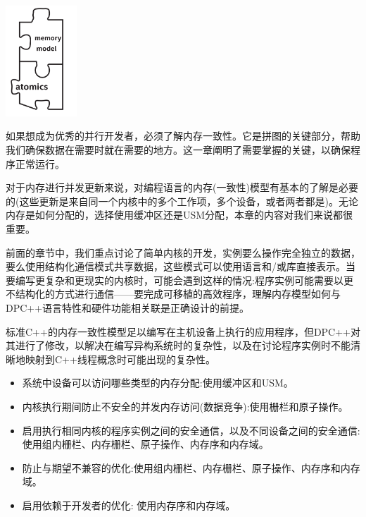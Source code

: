 \begin{center}
	\includegraphics[width=0.2\textwidth]{content/chapter-19/images/1}
\end{center}

如果想成为优秀的并行开发者，必须了解内存一致性。它是拼图的关键部分，帮助我们确保数据在需要时就在需要的地方。这一章阐明了需要掌握的关键，以确保程序正常运行。\par

对于内存进行并发更新来说，对编程语言的内存(一致性)模型有基本的了解是必要的(这些更新是来自同一个内核中的多个工作项，多个设备，或者两者都是)。无论内存是如何分配的，选择使用缓冲区还是USM分配，本章的内容对我们来说都很重要。\par

前面的章节中，我们重点讨论了简单内核的开发，实例要么操作完全独立的数据，要么使用结构化通信模式共享数据，这些模式可以使用语言和/或库直接表示。当要编写更复杂和更现实的内核时，可能会遇到这样的情况:程序实例可能需要以更不结构化的方式进行通信——要完成可移植的高效程序，理解内存模型如何与DPC++语言特性和硬件功能相关联是正确设计的前提。\par

标准C++的内存一致性模型足以编写在主机设备上执行的应用程序，但DPC++对其进行了修改，以解决在编写异构系统时的复杂性，以及在讨论程序实例时不能清晰地映射到C++线程概念时可能出现的复杂性。\par

\begin{itemize}
	\item 系统中设备可以访问哪些类型的内存分配:使用缓冲区和USM。
	\item 内核执行期间防止不安全的并发内存访问(数据竞争):使用栅栏和原子操作。
	\item 启用执行相同内核的程序实例之间的安全通信，以及不同设备之间的安全通信:使用组内栅栏、内存栅栏、原子操作、内存序和内存域。
	\item 防止与期望不兼容的优化:使用组内栅栏、内存栅栏、原子操作、内存序和内存域。
	\item 启用依赖于开发者的优化: 使用内存序和内存域。
\end{itemize}


